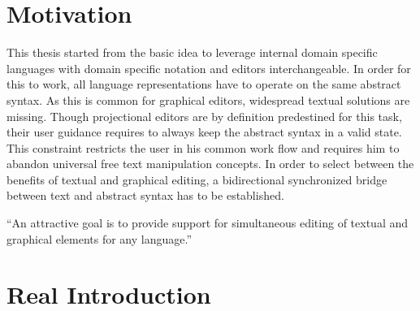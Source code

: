 \section{Motivation}
This thesis started from the basic idea to leverage internal domain specific languages with domain specific notation and editors interchangeable. In order for this to work, all language representations have to operate on the same abstract syntax. As this is common for graphical editors, widespread textual solutions are missing. Though projectional editors are by definition predestined for this task, their user guidance requires to always keep the abstract syntax in a valid state. This constraint restricts the user in his common work flow and requires him to abandon universal free text manipulation concepts. In order to select between the benefits of textual and graphical editing, a bidirectional synchronized bridge between text and abstract syntax has to be established.  

``An attractive goal is to provide support for simultaneous editing of textual and graphical elements for any language.''\cite{EMP}




\section{Real Introduction}






